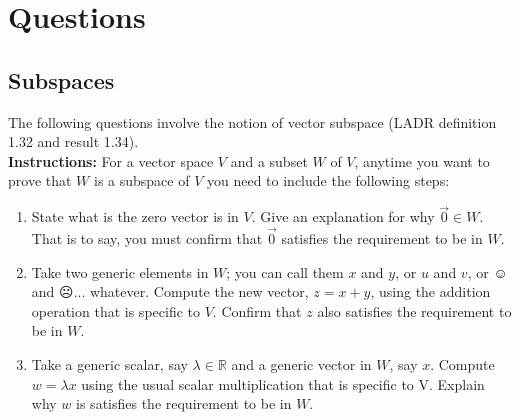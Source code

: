 \documentclass[12pt]{article}
\def\real{{\mathbb R}}
\def\lam{\lambda}
\begin{document}
\section{Questions}



\subsection{Subspaces}

The following questions involve the notion of vector subspace (LADR definition 1.32 and result 1.34).\\

\noindent \textbf{Instructions:} For a vector space $V$ and a subset $W$ of $V$, anytime you want to prove that $W$ is a subspace of $V$ you need to include the following steps:  
\begin{enumerate}[(1)]
	
	\item State what is the zero vector is in $V$.  Give an explanation for why $\vec{0}\in W$.  That is to say, you must confirm that $\vec{0}$ satisfies the requirement to be in $W$.
	
	\item Take two generic elements in $W$; you can call them $x$ and $y$, or $u$ and $v$, or $\smiley$ and $\frownie$... whatever.  Compute the new vector, $z=x+y$, using the addition operation that is specific to $V$.  Confirm that $z$ also satisfies the requirement to be in $W$.
	
	\item Take a generic scalar, say $\lam\in\real$ and a generic vector in $W$, say $x$.  Compute $w=\lam x$ using the usual scalar multiplication that is specific to V.  Explain why $w$ is satisfies the requirement to be in $W$.
	
\end{enumerate}

\vspace{0.5cm}
\end{document}

